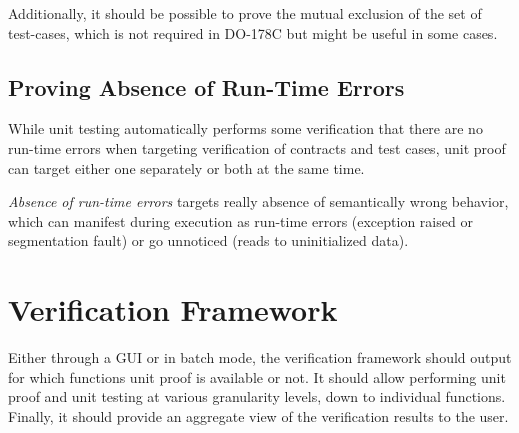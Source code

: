 \documentclass{article}
\begin{document}
Additionally, it should be possible to prove the mutual exclusion of the set of
test-cases, which is not required in DO-178C but might be useful in some cases.

\subsection{Proving Absence of Run-Time Errors}

While unit testing automatically performs some verification that there are no
run-time errors when targeting verification of contracts and test cases, unit
proof can target either one separately or both at the same time.

\textit{Absence of run-time errors} targets really absence of semantically
wrong behavior, which can manifest during execution as run-time errors
(exception raised or segmentation fault) or go unnoticed (reads to
uninitialized data).

\section{Verification Framework}

Either through a GUI or in batch mode, the verification framework should output
for which functions unit proof is available or not. It should allow
performing unit proof and unit testing at various granularity levels, down to
individual functions. Finally, it should provide an aggregate view of the
verification results to the user.
\end{document}
